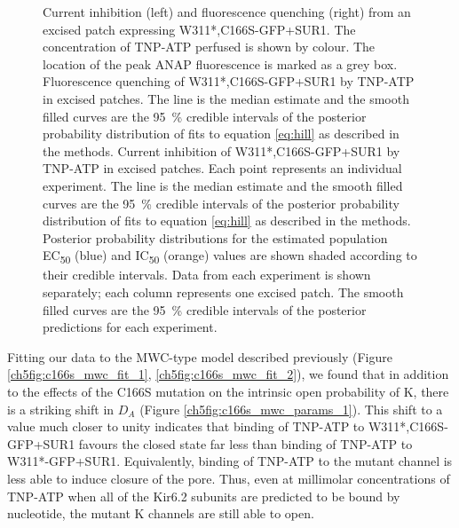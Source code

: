 \begin{figure}[hbtp]
	\caption[C166S alters sensitivity to nucleotide inhibition]{
	{\bf{}}
	 Current inhibition (left) and fluorescence quenching (right) from an excised patch expressing W311*,C166S-GFP+SUR1.
	The concentration of TNP-ATP perfused is shown by colour.
	The location of the peak ANAP fluorescence is marked as a grey box.
	 Fluorescence quenching of W311*,C166S-GFP+SUR1 by TNP-ATP in excised patches.
	The line is the median estimate and the smooth filled curves are the \SI{95}{\percent} credible intervals of the posterior probability distribution of fits to equation \ref{eq:hill} as described in the methods.
	 Current inhibition of W311*,C166S-GFP+SUR1 by TNP-ATP in excised patches.
	Each point represents an individual experiment.
	The line is the median estimate and the smooth filled curves are the \SI{95}{\percent} credible intervals of the posterior probability distribution of fits to equation \ref{eq:hill} as described in the methods.
	 Posterior probability distributions for the estimated population EC\textsubscript{50} (blue) and IC\textsubscript{50} (orange) values are shown shaded according to their credible intervals.
	 Data from each experiment is shown separately; each column represents one excised patch.
	The smooth filled curves are the \SI{95}{\percent} credible intervals of the posterior predictions for each experiment.
	}\label{ch5fig:c166s_2}
\end{figure}

Fitting our data to the MWC-type model described previously (Figure \ref{ch5fig:c166s_mwc_fit_1}, \ref{ch5fig:c166s_mwc_fit_2}), we found that in addition to the effects of the C166S mutation on the intrinsic open probability of K\ATP{}, there is a striking shift in $D_A$ (Figure \ref{ch5fig:c166s_mwc_params_1}).
This shift to a value much closer to unity indicates that binding of TNP-ATP to W311*,C166S-GFP+SUR1 favours the closed state far less than binding of TNP-ATP to W311*-GFP+SUR1.
Equivalently, binding of TNP-ATP to the mutant channel is less able to induce closure of the pore.
Thus, even at millimolar concentrations of TNP-ATP when all of the Kir6.2 subunits are predicted to be bound by nucleotide, the mutant K\ATP{} channels are still able to open.

